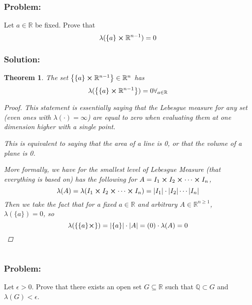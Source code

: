 \documentclass[]{article}
\newcommand{\R}{\mathbb{R}}
\newcommand{\Q}{\mathbb{Q}}
\newtheorem{theorem}{Theorem}
\begin{document}
\newpage
\section{}
\subsubsection*{Problem:}
Let $a \in \R$ be fixed. 
Prove that \[
    \lambda(\qty{a} \cross \R^{n-1}) = 0
\]
\subsubsection*{Solution:}
\begin{theorem}
    The set $\qty{
        \{a\} \cross \R^{n-1}
    } \in \R^n$ has \[
        \lambda(\qty{\{a\} \cross \R^{n-1}}) = 0 \forall_{a \in \R}
    \]
    \begin{proof}
        This statement is essentially saying that the Lebesgue measure for any set (even ones with $\lambda(\cdot) = \infty$) are equal to zero when evaluating them at one dimension higher with a single point.

        This is equivalent to saying that the area of a line is 0, or that the volume of a plane is 0.

        More formally, we have for the smallest level of Lebesgue Measure (that everything is based on) has the following for $A = I_1 \cross I_2 \cross \cdots \cross I_n$, \[
            \lambda(A) 
            = \lambda(I_1 \cross I_2 \cross \cdots \cross I_n) 
            = \abs{I_1} \cdot \abs{I_2} \cdots \abs{I_n}
        \] Then we take the fact that for a fixed $a \in \R$ and arbitrary $A \in \R^{n\geq 1}$, 
        $\lambda(\{a\}) = 0$, so \[
            \lambda(\{\{a\} \cross \}) 
            = \abs{\{a\}} \cdot \abs{A} 
            = (0) \cdot \lambda(A)
            = 0
        \]
    \end{proof}
\end{theorem}

\newpage
\section{}
\subsection{}
\subsubsection*{Problem:}
Let $\epsilon > 0$. 
Prove that there exists an open set $G \subseteq \R$ such that $\Q \subset G$ and $\lambda(G) < \epsilon$.
\end{document}
